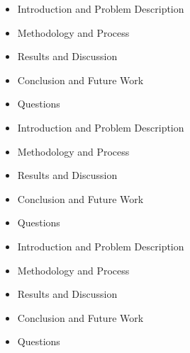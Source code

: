 
\begin{frame}

  \begin{itemize}
    \item Introduction and Problem Description
    \item Methodology and Process
    \item Results and Discussion  
    \item Conclusion and Future Work
    \item Questions
  \end{itemize}
  
\end{frame}

\begin{frame}

  \begin{itemize}
    \item Introduction and Problem Description
    \item Methodology and Process
    \item Results and Discussion  
    \item Conclusion and Future Work
    \item Questions
  \end{itemize}
  
\end{frame}

\begin{frame}

  \begin{itemize}
    \item Introduction and Problem Description
    \item Methodology and Process
    \item Results and Discussion  
    \item Conclusion and Future Work
    \item Questions
  \end{itemize}
  
\end{frame}